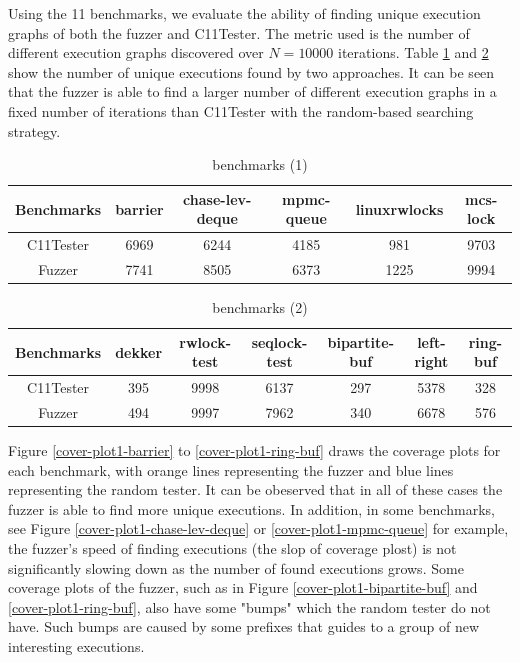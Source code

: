 Using the 11 benchmarks, we evaluate the ability of finding unique execution graphs of both the fuzzer and C11Tester. The metric used is the number of different execution graphs discovered over $N = 10000$ iterations. Table \ref{c11fuzzer-bench1} and \ref{c11fuzzer-bench2} show the number of unique executions found by two approaches. It can be seen that the fuzzer is able to find a larger number of different execution graphs in a fixed number of iterations than C11Tester with the random-based searching strategy. 


\begin{table}[h!]
    \begin{tabular}{ |c|ccccc| } 
     \hline
     Benchmarks & barrier & chase-lev-deque & mpmc-queue & linuxrwlocks & mcs-lock \\ 
     \hline
     C11Tester & 6969  & 6244 & 4185 &  981 & 9703 \\ 
     Fuzzer & 7741 & 8505  & 6373& 1225 &  9994   \\ 
     \hline
    \end{tabular}
    \caption{benchmarks (1)}
    \label{c11fuzzer-bench1}
    
\end{table}

\begin{table}[h!]
    \begin{tabular}{ |c|cccccc| } 
     \hline
     Benchmarks & dekker & rwlock-test  & seqlock-test &bipartite-buf &  left-right  &   ring-buf \\ 
     \hline
     C11Tester &  395      &     9998     &     6137     &     297      &     5378     &     328   \\ 
     Fuzzer & 494      &     9997     &     7962     &     340      &     6678     &     576    \\ 
     \hline
    \end{tabular}
    \caption{benchmarks (2)}
    \label{c11fuzzer-bench2}
\end{table}

Figure \ref{cover-plot1-barrier} to \ref{cover-plot1-ring-buf} draws the coverage plots for each benchmark, with orange lines representing the fuzzer and blue lines representing the random tester. It can be obeserved that in all of these cases the fuzzer is able to find more unique executions. In addition, in some benchmarks, see Figure \ref{cover-plot1-chase-lev-deque} or \ref{cover-plot1-mpmc-queue} for example, the fuzzer's speed of finding executions (the slop of coverage plost) is not significantly slowing down as the number of found executions grows. Some coverage plots of the fuzzer, such as in Figure \ref{cover-plot1-bipartite-buf} and \ref{cover-plot1-ring-buf}, also have some "bumps" which the random tester do not have. Such bumps are caused by some prefixes that guides to a group of new interesting executions. 

